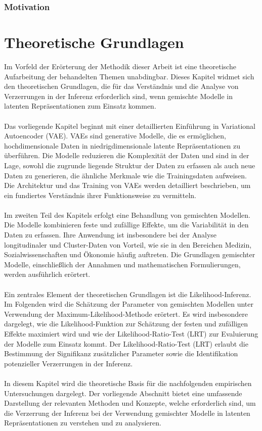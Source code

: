 \documentclass[%
thesis=student,%
coverpage=false,%
titlepage=false,%
headmarks=true, %
german,%
font=libertine, %
math=newpxtx, %
BCOR=5mm,%
coverBCOR=11mm%
]{tumbook}
\theoremstyle{break}
\begin{document}
\subsection{Motivation}


\chapter{Theoretische Grundlagen}
Im Vorfeld der Erörterung der Methodik dieser Arbeit ist eine theoretische Aufarbeitung der behandelten Themen unabdingbar. Dieses Kapitel widmet sich den theoretischen Grundlagen, die für das Verständnis und die Analyse von Verzerrungen in der Inferenz erforderlich sind, wenn gemischte Modelle in latenten Repräsentationen zum Einsatz kommen.\\
\\
Das vorliegende Kapitel beginnt mit einer detaillierten Einführung in Variational Autoencoder (VAE). VAEs sind generative Modelle, die es ermöglichen, hochdimensionale Daten in niedrigdimensionale latente Repräsentationen zu überführen. Die Modelle reduzieren die Komplexität der Daten und sind in der Lage, sowohl die zugrunde liegende Struktur der Daten zu erfassen als auch neue Daten zu generieren, die ähnliche Merkmale wie die Trainingsdaten aufweisen. Die Architektur und das Training von VAEs werden detailliert beschrieben, um ein fundiertes Verständnis ihrer Funktionsweise zu vermitteln.\\
\\
Im zweiten Teil des Kapitels erfolgt eine Behandlung von gemischten Modellen. Die Modelle kombinieren feste und zufällige Effekte, um die Variabilität in den Daten zu erfassen. Ihre Anwendung ist insbesondere bei der Analyse longitudinaler und Cluster-Daten von Vorteil, wie sie in den Bereichen Medizin, Sozialwissenschaften und Ökonomie häufig auftreten. Die Grundlagen gemischter Modelle, einschließlich der Annahmen und mathematischen Formulierungen, werden ausführlich erörtert.\\
\\
Ein zentrales Element der theoretischen Grundlagen ist die Likelihood-Inferenz. Im Folgenden wird die Schätzung der Parameter von gemischten Modellen unter Verwendung der Maximum-Likelihood-Methode erörtert. Es wird insbesondere dargelegt, wie die Likelihood-Funktion zur Schätzung der festen und zufälligen Effekte maximiert wird und wie der Likelihood-Ratio-Test (LRT) zur Evaluierung der Modelle zum Einsatz kommt. Der Likelihood-Ratio-Test (LRT) erlaubt die Bestimmung der Signifikanz zusätzlicher Parameter sowie die Identifikation potenzieller Verzerrungen in der Inferenz.\\
\\
In diesem Kapitel wird die theoretische Basis für die nachfolgenden empirischen Untersuchungen dargelegt. Der vorliegende Abschnitt bietet eine umfassende Darstellung der relevanten Methoden und Konzepte, welche erforderlich sind, um die Verzerrung der Inferenz bei der Verwendung gemischter Modelle in latenten Repräsentationen zu verstehen und zu analysieren.\\
\end{document}
